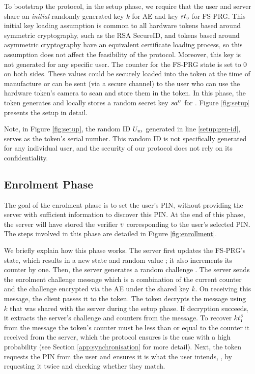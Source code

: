 To bootstrap the protocol, in the setup phase, we require that the user
and server share an \emph{initial} randomly generated key $k$ for AE and key ${st}_{\scriptscriptstyle 0}$ for  FS-PRG.
This initial key loading assumption is common to all hardware tokens based around symmetric cryptography, such as the RSA SecureID, and tokens based around asymmetric cryptography have an equivalent certificate loading process, so this assumption does not affect the feasibility of the protocol. Moreover, this key is not generated for any specific user. 
The counter for the FS-PRG state is set to $0$ on both sides. 
These values could be securely loaded into the token at the time of
manufacture or can be sent (via a secure channel) to the user who can use the hardware token's camera to scan and store them in the token.
In this phase, the token generates and locally stores a random secret key ${sa}^{\scriptscriptstyle U}$ for \prf.  Figure \ref{fig:setup} presents the setup in detail. 




Note, in Figure \ref{fig:setup}, the random ID $U_{\scriptscriptstyle \mathrm{ID}}$ generated in line \ref{setup:gen-id}, serves as the token's serial number. This random ID is not specifically generated for any individual user, and the security of our protocol does not rely on its confidentiality. 

\subsection{Enrolment Phase}
\label{sec:enrollment}

The goal of the enrolment phase is to set the user's PIN, without providing the  
 server with sufficient information to discover this PIN. 
% 
  At the end of this phase, the server will have stored the verifier ${v}$ corresponding to the user's selected PIN.
The steps involved in this phase are detailed in Figure \ref{fig:enrollment}.  







We briefly explain how this phase works.  The server first updates the FS-PRG's state, which results in a new state and random value ; it also increments its counter by one. Then, the server generates a random challenge \VS{\nonce}. The server sends the enrolment challenge message which is a combination of the current counter and the challenge encrypted via the AE under the shared key $k$.
%
 On receiving this message, the client passes it to the token. The token decrypts the message using $k$ that was shared with the server during the setup phase.  If decryption succeeds, it extracts the server's challenge and counters from the message. To recover ${kt}_{\scriptscriptstyle 1}^{\scriptscriptstyle S}$ from the message the token's counter must be less than or equal to the counter it received from the server, which the protocol ensures is the case with a high probability (see Section \ref{app:synchronisation} for more detail). Next, the token requests the PIN from the user and ensures it is what the user intends, \eg, by requesting it twice and checking whether they match.


